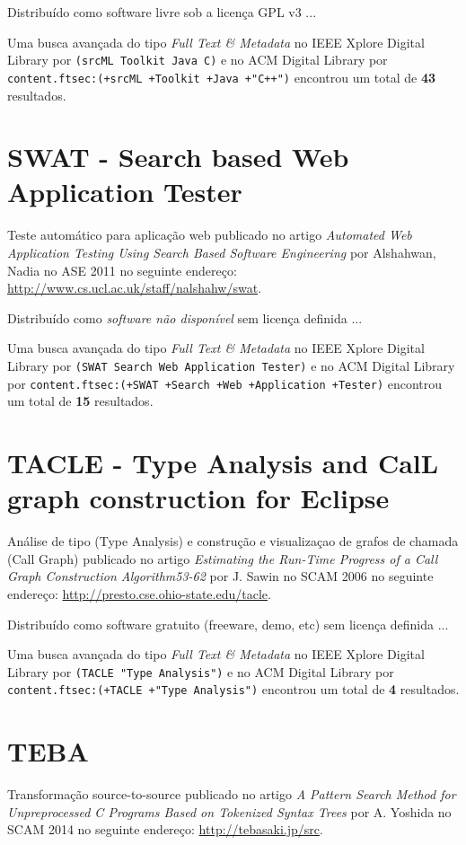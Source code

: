 Distribuído como software livre
sob a licença GPL v3 ...


Uma busca avançada do tipo {\it Full Text \& Metadata} no IEEE Xplore Digital Library por
\texttt{(srcML Toolkit Java C)}
e no ACM Digital Library por
\texttt{content.ftsec:(+srcML +Toolkit +Java +"C++")}
encontrou um total de
{\bf 43}
resultados.

\section{SWAT - Search based Web Application Tester}

Teste automático para aplicação web
publicado no artigo
{\it Automated Web Application Testing Using Search Based Software Engineering}
por
Alshahwan, Nadia
no
ASE
2011
no seguinte endereço:
\url{http://www.cs.ucl.ac.uk/staff/nalshahw/swat}.

Distribuído como {\it software não disponível}
sem licença definida ...


Uma busca avançada do tipo {\it Full Text \& Metadata} no IEEE Xplore Digital Library por
\texttt{(SWAT Search Web Application Tester)}
e no ACM Digital Library por
\texttt{content.ftsec:(+SWAT +Search +Web +Application +Tester)}
encontrou um total de
{\bf 15}
resultados.

\section{TACLE - Type Analysis and CalL graph construction for Eclipse}

Análise de tipo (Type Analysis) e construção e visualizaçao de grafos de chamada (Call Graph)
publicado no artigo
{\it Estimating the Run-Time Progress of a Call Graph Construction Algorithm53-62}
por
J. Sawin
no
SCAM
2006
no seguinte endereço:
\url{http://presto.cse.ohio-state.edu/tacle}.

Distribuído como software gratuito (freeware, demo, etc)
sem licença definida ...


Uma busca avançada do tipo {\it Full Text \& Metadata} no IEEE Xplore Digital Library por
\texttt{(TACLE "Type Analysis")}
e no ACM Digital Library por
\texttt{content.ftsec:(+TACLE +"Type Analysis")}
encontrou um total de
{\bf 4}
resultados.

\section{TEBA}

Transformação source-to-source
publicado no artigo
{\it A Pattern Search Method for Unpreprocessed C Programs Based on Tokenized Syntax Trees}
por
A. Yoshida
no
SCAM
2014
no seguinte endereço:
\url{http://tebasaki.jp/src}.

